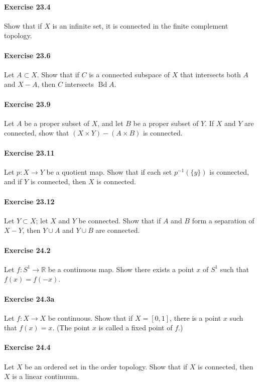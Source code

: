 \documentclass{article}
\begin{document}
\paragraph{Exercise 23.4} Show that if $X$ is an infinite set, it is connected in the finite complement topology.

\paragraph{Exercise 23.6} Let $A \subset X$. Show that if $C$ is a connected
subspace of $X$ that intersects both $A$ and $X-A$, then $C$ intersects
$\operatorname{Bd} A$.

\paragraph{Exercise 23.9} Let $A$ be a proper subset of $X$, and let $B$ be a proper subset of $Y$. If $X$ and $Y$ are connected, show that $(X \times Y)-(A \times B)$ is connected.

\paragraph{Exercise 23.11} Let $p: X \rightarrow Y$ be a quotient map. Show that if each set $p^{-1}(\{y\})$ is connected, and if $Y$ is connected, then $X$ is connected.

\paragraph{Exercise 23.12} Let $Y \subset X$; let $X$ and $Y$ be connected. Show that if $A$ and $B$ form a separation of $X-Y$, then $Y \cup A$ and $Y \cup B$ are connected.

\paragraph{Exercise 24.2} Let $f: S^{1} \rightarrow \mathbb{R}$ be a continuous map. Show there exists a point $x$ of $S^{1}$ such that $f(x)=f(-x)$.

\paragraph{Exercise 24.3a} Let $f \colon X \rightarrow X$ be continuous. Show that if $X = [0, 1]$, there is a point $x$ such that $f(x) = x$. (The point $x$ is called a fixed point of $f$.)

\paragraph{Exercise 24.4} Let $X$ be an ordered set in the order topology. Show that if $X$ is connected, then $X$ is a linear continuum.
\end{document}
